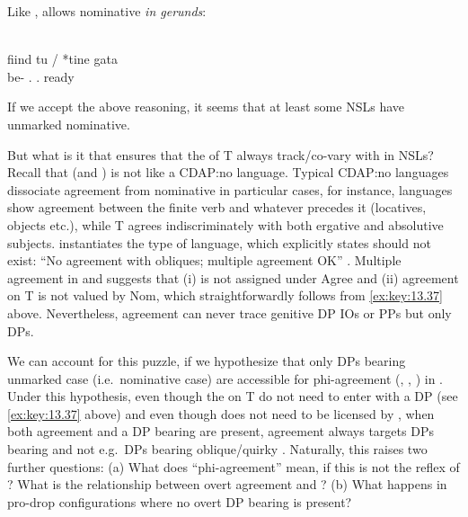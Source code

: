 \documentclass[output=paper]{langsci/langscibook}
\begin{document}
\begin{exe}
Like ,  allows nominative \emph{in gerunds}:

\ea\label{ex:key:13.42} \citep{Alboiu2009}\\
    \gll fiind tu / *tine gata\\
    be-\Ger{}    \Ssg.\Nom{} {} \hphantom{*}\Ssg.\Acc{} ready\\
    \glt
\z

If we accept the above reasoning, it seems that at least some \glspl{NSL} have
unmarked nominative.

But what is it that ensures that the  of T always track/co-vary
with \Nom{} in \glspl{NSL}? Recall that  (and ) is not
like a \gls{CDAP}:no language. Typical \gls{CDAP}:no languages dissociate agreement from
nominative in particular cases, for instance,  languages show agreement
between the finite verb and whatever precedes it (locatives, objects etc.),
while  T agrees indiscriminately with both ergative and
absolutive subjects.  instantiates
the type of language, which \citet{Baker2008} explicitly states should not
exist: “No agreement with obliques; multiple agreement OK” \parencite[223,
(113d)]{Baker2008}. Multiple agreement in  and  suggests
that (i) \Nom{} is not assigned under Agree and (ii) agreement on T is not
valued by Nom, which straightforwardly follows from \eqref{ex:key:13.37} above.
Nevertheless, agreement can never trace genitive DP
\glspl{IO} or PPs but only \Nom{} DPs.

We can account for this puzzle, if we hypothesize that only DPs bearing
unmarked case (i.e.\ nominative case) are accessible for
phi-agreement (\citealt{Bobaljik2008}, \citealt{Preminger2014},
\citealt{Baker2015}) in . Under this hypothesis, even though the
 on T do not need to enter  with a DP (see
\eqref{ex:key:13.37} above) and even though \Nom{} does not need to be licensed
by , when both agreement and a DP bearing \Nom{} are present,
agreement always targets DPs bearing \Nom{} and not e.g.\ DPs bearing
oblique/quirky \Gen. Naturally, this raises two further questions: (a) What
does \enquote{phi-agreement} mean, if this is not the reflex of ?
What is the relationship between overt agreement and ? (b) What
happens in pro-drop configurations where no overt DP bearing \Nom{} is present?


\end{exe}
\end{document}
